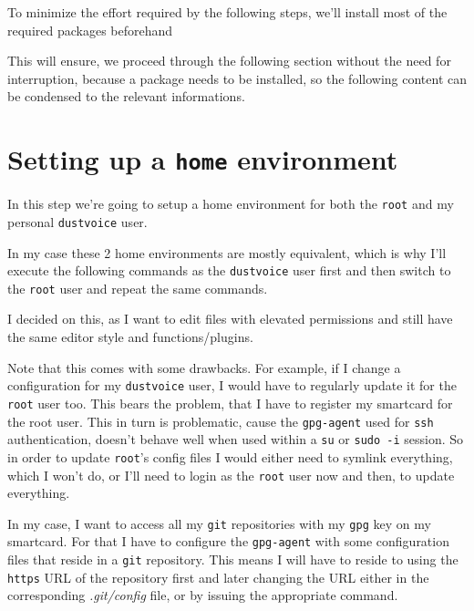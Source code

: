 \documentclass[10pt]{dustdoc}
\begin{document}
To minimize the effort required by the following steps, we’ll install most of the required packages beforehand

This will ensure, we proceed through the following section without the need for interruption, because a package needs to be installed, so the following content can be condensed to the relevant informations.

\section{Setting up a \texttt{home} environment}
\label{sec:setting-up-a-home-environment}

In this step we’re going to setup a home environment for both the \texttt{root} and my personal \texttt{dustvoice} user.

\begin{NOTE}
    In my case these 2 home environments are mostly equivalent, which is why I’ll execute the following commands as the \texttt{dustvoice} user first and then switch to the \texttt{root} user and repeat the same commands.

    I decided on this, as I want to edit files with elevated permissions and still have the same editor style and functions/plugins.

    Note that this comes with some drawbacks.
    For example, if I change a configuration for my \texttt{dustvoice} user, I would have to regularly update it for the \texttt{root} user too.
    This bears the problem, that I have to register my smartcard for the root user.
    This in turn is problematic, cause the \texttt{gpg-agent} used for \texttt{ssh} authentication, doesn’t behave well when used within a \texttt{su} or \texttt{sudo -i} session.
    So in order to update \texttt{root}'s config files I would either need to symlink everything, which I won’t do, or I’ll need to login as the \texttt{root} user now and then, to update everything.
\end{NOTE}

\begin{NOTE}
    In my case, I want to access all my \texttt{git} repositories with my \texttt{gpg} key on my smartcard.
    For that I have to configure the \texttt{gpg-agent} with some configuration files that reside in a \texttt{git} repository.
    This means I will have to reside to using the \texttt{https} URL of the repository first and later changing the URL either in the corresponding \textit{.git/config} file, or by issuing the appropriate command.
\end{NOTE}
\end{document}
